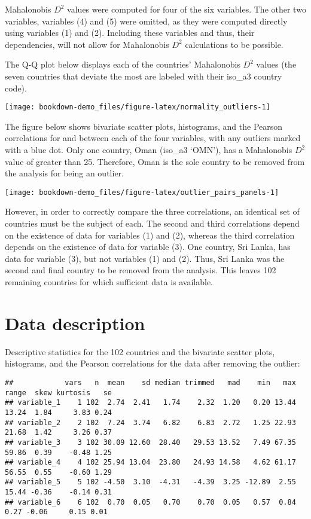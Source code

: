 \documentclass[]{book}
\begin{document}
Mahalonobis \(D^{2}\) values were computed for four of the six
variables. The other two variables, variables (4) and (5) were omitted,
as they were computed directly using variables (1) and (2). Including
these variables and thus, their dependencies, will not allow for
Mahalonobis \(D^{2}\) calculations to be possible.

The Q-Q plot below displays each of the countries' Mahalonobis \(D^{2}\)
values (the seven countries that deviate the most are labeled with their
iso\_a3 country code).

\begin{center}\texttt{[image: bookdown-demo\_files/figure-latex/normality\_outliers-1]} \end{center}

The figure below shows bivariate scatter plots, histograms, and the
Pearson correlations for and between each of the four variables, with
any outliers marked with a blue dot. Only one country, Oman (iso\_a3
`OMN'), has a Mahalonobis \(D^{2}\) value of greater than 25. Therefore,
Oman is the sole country to be removed from the analysis for being an
outlier.

\begin{center}\texttt{[image: bookdown-demo\_files/figure-latex/outlier\_pairs\_panels-1]} \end{center}

However, in order to correctly compare the three correlations, an
identical set of countries must be the subject of each. The second and
third correlations depend on the existence of data for variables (1) and
(2), whereas the third correlation depends on the existence of data for
variable (3). One country, Sri Lanka, has data for variable (3), but not
variables (1) and (2). Thus, Sri Lanka was the second and final country
to be removed from the analysis. This leaves 102 remaining countries for
which sufficient data is available.

\section{Data description}\label{data-description}

Descriptive statistics for the 102 countries and the bivariate scatter
plots, histograms, and the Pearson correlations for the data after
removing the outlier:

\begin{verbatim}
##            vars   n  mean    sd median trimmed   mad    min   max range  skew kurtosis   se
## variable_1    1 102  2.74  2.41   1.74    2.32  1.20   0.20 13.44 13.24  1.84     3.83 0.24
## variable_2    2 102  7.24  3.74   6.82    6.83  2.72   1.25 22.93 21.68  1.42     3.26 0.37
## variable_3    3 102 30.09 12.60  28.40   29.53 13.52   7.49 67.35 59.86  0.39    -0.48 1.25
## variable_4    4 102 25.94 13.04  23.80   24.93 14.58   4.62 61.17 56.55  0.55    -0.60 1.29
## variable_5    5 102 -4.50  3.10  -4.31   -4.39  3.25 -12.89  2.55 15.44 -0.36    -0.14 0.31
## variable_6    6 102  0.70  0.05   0.70    0.70  0.05   0.57  0.84  0.27 -0.06     0.15 0.01
\end{verbatim}
\end{document}
